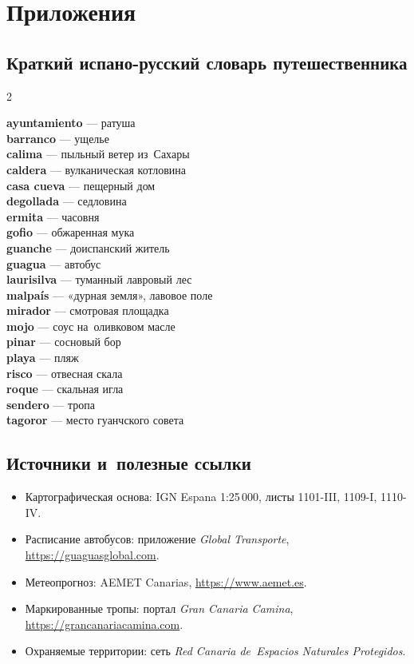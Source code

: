 \chapter{Приложения}

\section*{Краткий испано-русский словарь путешественника}

\begin{multicols}{2}\small\raggedright
\textbf{ayuntamiento} --- ратуша \\
\textbf{barranco} --- ущелье \\
\textbf{calima} --- пыльный ветер из~Сахары \\
\textbf{caldera} --- вулканическая котловина \\
\textbf{casa cueva} --- пещерный дом \\
\textbf{degollada} --- седловина \\
\textbf{ermita} --- часовня \\
\textbf{gofio} --- обжаренная мука \\
\textbf{guanche} --- доиспанский житель \\
\textbf{guagua} --- автобус \\
\textbf{laurisilva} --- туманный лавровый лес \\
\textbf{malpaís} --- «дурная земля», лавовое поле \\
\textbf{mirador} --- смотровая площадка \\
\textbf{mojo} --- соус на~оливковом масле \\
\textbf{pinar} --- сосновый бор \\
\textbf{playa} --- пляж \\
\textbf{risco} --- отвесная скала \\
\textbf{roque} --- скальная игла \\
\textbf{sendero} --- тропа \\
\textbf{tagoror} --- место гуанчского совета \\
\end{multicols}

\section*{Источники и~полезные ссылки}

\begin{itemize}
\item Картографическая основа: IGN Espana 1:25\,000, листы 1101-III,
      1109-I, 1110-IV.
\item Расписание автобусов: приложение \textit{Global Transporte},
      \url{https://guaguasglobal.com}.
\item Метеопрогноз: AEMET Canarias, \url{https://www.aemet.es}.
\item Маркированные тропы: портал \textit{Gran Canaria Camina},
      \url{https://grancanariacamina.com}.
\item Охраняемые территории: сеть \textit{Red Canaria de~Espacios
      Naturales Protegidos}.
\end{itemize}

\vspace{1em}
